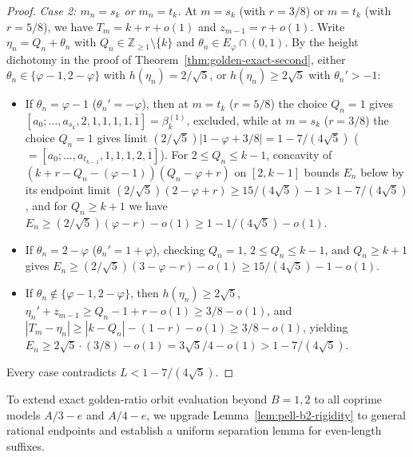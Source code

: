 \documentclass[11pt]{amsart}
\theoremstyle{definition}
\theoremstyle{remark}
\numberwithin{equation}{section}
\newcommand{\Z}{\mathbb{Z}}
\begin{document}
\begin{proof}
\emph{Case 2: $m_n=s_k$ or $m_n=t_k$.}
At $m=s_k$ (with $r=3/8$) or $m=t_k$ (with $r=5/8$), we have
$T_m=k+r+o(1)$ and $z_{m-1}=r+o(1)$. Write $\eta_n=Q_n+\theta_n$ with
$Q_n\in\Z_{\ge1}\setminus\{k\}$ and $\theta_n\in E_\varphi\cap(0,1)$. By
the height dichotomy in the proof of Theorem~\ref{thm:golden-exact-second},
either $\theta_n\in\{\varphi-1,2-\varphi\}$ with $h(\eta_n)=2/\sqrt5$,
or $h(\eta_n)\ge2\sqrt5$ with $\theta_n'>-1$:
\begin{itemize}
\item If $\theta_n=\varphi-1$ ($\theta_n'=-\varphi$), then at $m=t_k$
      ($r=5/8$) the choice $Q_n=1$ gives
      $[a_0;\ldots,a_{s_k},2,1,1,1,1,\overline1]=\beta_k^{(1)}$, excluded,
      while at $m=s_k$ ($r=3/8$) the choice $Q_n=1$ gives limit
      $(2/\sqrt5)|1-\varphi+3/8|=1-7/(4\sqrt5)$
      ($=[a_0;\ldots,a_{t_{k-1}},1,1,1,2,\overline1]$). For
      $2\le Q_n\le k-1$, concavity of
      $(k+r-Q_n-(\varphi-1))(Q_n-\varphi+r)$ on $[2,k-1]$ bounds $E_n$
      below by its endpoint limit
      $(2/\sqrt5)(2-\varphi+r)\ge 15/(4\sqrt5)-1>1-7/(4\sqrt5)$, and for
      $Q_n\ge k+1$ we have $E_n\ge(2/\sqrt5)(\varphi-r)-o(1)\ge 1-1/(4\sqrt5)-o(1)$.
\item If $\theta_n=2-\varphi$ ($\theta_n'=1+\varphi$), checking $Q_n=1$,
      $2\le Q_n\le k-1$, and $Q_n\ge k+1$ gives
      $E_n\ge(2/\sqrt5)(3-\varphi-r)-o(1)\ge 15/(4\sqrt5)-1-o(1)$.
\item If $\theta_n\notin\{\varphi-1,2-\varphi\}$, then $h(\eta_n)\ge2\sqrt5$,
      $\eta_n'+z_{m-1}\ge Q_n-1+r-o(1)\ge 3/8-o(1)$, and
      $|T_m-\eta_n|\ge|k-Q_n|-(1-r)-o(1)\ge 3/8-o(1)$, yielding
      $E_n\ge 2\sqrt5\cdot(3/8)-o(1)=3\sqrt5/4-o(1)>1-7/(4\sqrt5)$.
\end{itemize}
Every case contradicts $L<1-7/(4\sqrt5)$.
\end{proof}

To extend exact golden-ratio orbit evaluation beyond $B=1,2$ to all
coprime models $A/3-e$ and $A/4-e$, we upgrade
Lemma~\ref{lem:pell-b2-rigidity} to general rational endpoints and
establish a uniform separation lemma for even-length suffixes.
\end{document}

